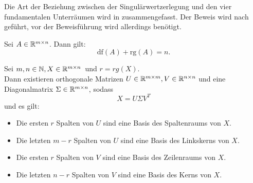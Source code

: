 Die Art der Beziehung zwischen der Singulärwertzerlegung und den vier fundamentalen Unterräumen wird in  zusammengefasst.
Der Beweis wird nach~\cite[S. 214~f.]{johnstonAdvancedLinearMatrix2021} geführt, vor der Beweisführung wird allerdings  benötigt.
\begin{repitition}[Dimensionssatz]\label{rep:dim}
    Sei \(A \in \mathbb{R}^{m \times n}\). Dann gilt:
    \begin{equation*}
        \text{df}(A) + \text{rg}(A) = n.
    \end{equation*} 
\end{repitition}
\begin{corollary}\label{cor:svd}
    Sei \(m,n\in\mathbb{N}, X \in \mathbb{R}^{m \times n}\)\ und \(r = \textit{rg}(X)\).  \\
    Dann existieren orthogonale Matrizen \(U \in \mathbb{R}^{m \times m}, V \in \mathbb{R}^{n \times n}\) und eine Diagonalmatrix \(\Sigma \in \mathbb{R}^{m \times n}\), sodass
    \begin{equation*}
        X = U \Sigma V^{T}
    \end{equation*}   
    und es gilt:
    \begin{itemize}
        \item Die ersten \(r\) Spalten von \(U\) sind eine Basis des Spaltenraums von \(X\).
        \item Die letzten \(m-r\) Spalten von \(U\) sind eine Basis des Linkskerns von \(X\).
        \item Die ersten \(r\) Spalten von \(V\) sind eine Basis des Zeilenraums von \(X\).
        \item Die letzten \(n - r\) Spalten von \(V\) sind eine Basis des Kerns von \(X\).          
    \end{itemize}
\end{corollary}
